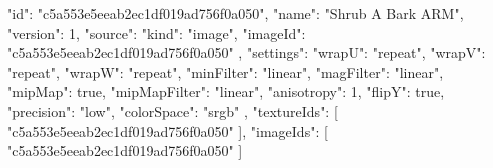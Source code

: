{
  "id": "c5a553e5eeab2ec1df019ad756f0a050",
  "name": "Shrub A Bark ARM",
  "version": 1,
  "source": {
    "kind": "image",
    "imageId": "c5a553e5eeab2ec1df019ad756f0a050"
  },
  "settings": {
    "wrapU": "repeat",
    "wrapV": "repeat",
    "wrapW": "repeat",
    "minFilter": "linear",
    "magFilter": "linear",
    "mipMap": true,
    "mipMapFilter": "linear",
    "anisotropy": 1,
    "flipY": true,
    "precision": "low",
    "colorSpace": "srgb"
  },
  "textureIds": [
    "c5a553e5eeab2ec1df019ad756f0a050"
  ],
  "imageIds": [
    "c5a553e5eeab2ec1df019ad756f0a050"
  ]
}
